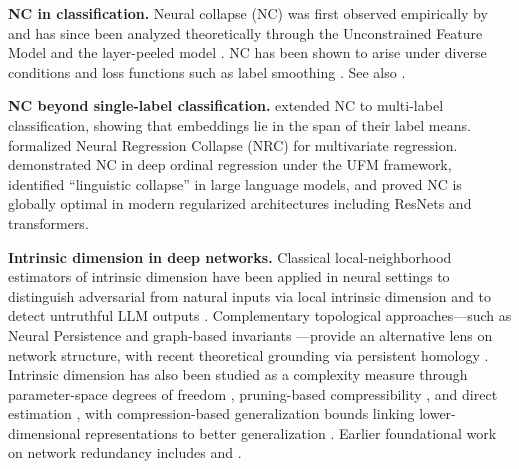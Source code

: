 \documentclass{article}
\theoremstyle{plain}
\theoremstyle{definition}
\theoremstyle{remark}
\begin{document}
\textbf{NC in classification.} Neural collapse (NC) was first observed empirically by \citet{papyan2020prevalence} and has since been analyzed theoretically through the Unconstrained Feature Model \citep{mixon2020neural} and the layer-peeled model \citep{fang2021exploring}. NC has been shown to arise under diverse conditions \citep{han2021neural, tirer2022extended, yaras2022neural, zhou2022optimization, zhou2022all, zhu2021geometric} and loss functions such as label smoothing \citep{guo2024cross}. See also \citep{hong2023neural, thrampoulidis2022imbalance, yang2022inducing}. 

\textbf{NC beyond single-label classification.} \citet{li2023neural} extended NC to multi-label classification, showing that embeddings lie in the span of their label means. \citet{andriopoulos2024prevalence} formalized Neural Regression Collapse (NRC) for multivariate regression. \citet{ma2025neural} demonstrated NC in deep ordinal regression under the UFM framework, \citet{wu2024linguistic} identified ``linguistic collapse'' in large language models, and \citet{sukenik2025neural} proved NC is globally optimal in modern regularized architectures including ResNets and transformers.

\textbf{Intrinsic dimension in deep networks.} Classical local-neighborhood estimators of intrinsic dimension \citep{levina2004maximum, amsaleg2015estimating, facco2017estimating,allegra2020data} have been applied in neural settings to distinguish adversarial from natural inputs via local intrinsic dimension \citep{ma2018characterizing} and to detect untruthful LLM outputs \citep{yin2024characterizing}. Complementary topological approaches---such as Neural Persistence \citep{rieck2018neural} and graph-based invariants \citep{corneanu2019does, corneanu2020computing}---provide an alternative lens on network structure, with recent theoretical grounding via persistent homology \citep{birdal2021intrinsic}. Intrinsic dimension has also been studied as a complexity measure through parameter-space degrees of freedom \citep{gao2016degrees, janson2015effective}, pruning-based compressibility \citep{blier2018description}, and direct estimation \citep{ansuini2019intrinsic, li2018measuring, ma2018dimensionality, pope2021intrinsic}, with compression-based generalization bounds linking lower-dimensional representations to better generalization \citep{arora2018stronger, barsbey2021heavy, hsu2021generalization, suzuki2018spectral, suzuki2019compression, zhang2024topology}. Earlier foundational work on network redundancy includes \citet{denil2013predicting} and \citet{lecun1989optimal}.
\end{document}
